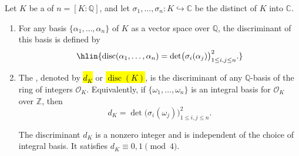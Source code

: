 \begin{definition} \label{definition:discriminant_of_a_number_field}
Let $K$ be a  of  $n = [K : \mathbb{Q}]$, and let $\sigma_1, \ldots, \sigma_n : K \hookrightarrow \mathbb{C}$ be the distinct  of $K$ into $\mathbb{C}$.

\begin{enumerate}
    \item For any basis $\{\alpha_1, \ldots, \alpha_n\}$ of $K$ as a vector space over $\mathbb{Q}$, the discriminant of this basis is defined by
    $$\hlin{\operatorname{disc}(\alpha_1, \ldots, \alpha_n) = \det\bigl(\sigma_i(\alpha_j)\bigr)_{1 \leq i,j \leq n}^2.}$$

    \item The , denoted by \hl{$d_K$} or \hl{$\operatorname{disc}(K)$}, is the discriminant of any $\mathbb{Q}$-basis of the ring of integers $\mathcal{O}_K$. Equivalently, if $\{\omega_1, \ldots, \omega_n\}$ is an integral basis for $\mathcal{O}_K$ over $\mathbb{Z}$, then
    $$d_K = \det\bigl(\sigma_i(\omega_j)\bigr)_{1 \leq i,j \leq n}^2.$$

    The discriminant $d_K$ is a nonzero integer and is independent of the choice of integral basis. It satisfies $d_K \equiv 0, 1 \pmod{4}$.

\end{enumerate}
\end{definition}
